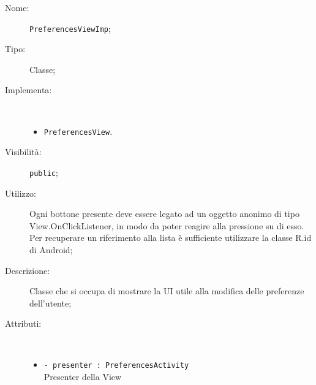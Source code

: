 \documentclass[../DefinizioneDiProdotto.tex]{subfiles}
\begin{document}
    \begin{description}
\item[Nome:] \texttt{PreferencesViewImp};
\item[Tipo:] Classe;
\item[Implementa:] \
\begin{itemize}
\item \texttt{PreferencesView}.

\end{itemize}
\item[Visibilità:] \texttt{public};
\item[Utilizzo:] Ogni bottone presente deve essere legato ad un oggetto anonimo di tipo View.OnClickListener, in modo da poter reagire alla pressione su di esso. Per recuperare un riferimento alla lista è sufficiente utilizzare la classe R.id di Android;
\item[Descrizione:] Classe che si occupa di mostrare la UI utile alla modifica delle preferenze dell'utente;
\item[Attributi:] \
\begin{itemize}
\item \texttt{- presenter : PreferencesActivity}\\
Presenter della View


\end{itemize}
\end{description}
\end{document}
